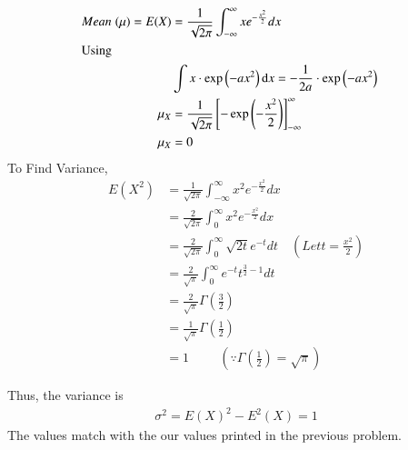 \documentclass[journal,10pt,twocolumn]{IEEEtran}
\newcounter{Chapcounter}
\numberwithin{equation}{subsection}
\numberwithin{figure}{subsection}
\renewcommand\thesection{\theChapcounter.\arabic{section}}
\providecommand{\brak}[1]{\ensuremath{\left(#1\right)}}
\renewcommand\thesection{\arabic{section}}
\renewcommand\thesubsection{\thesection.\arabic{subsection}}
\begin{document}
\begin{enumerate}[label=\thesubsection.\arabic*,ref=\thesubsection.\arabic{figure}]
\begin{align}
    Mean\hspace{0.1cm}(\mu) = E(X) &= \frac{1}{\sqrt{2\pi}} \int_{-\infty}^{\infty} x e^{-\frac{x^2}{2}}dx\\
    \intertext{Using}&
	\int x \cdot \exp \left( -a x^2 \right) \mathrm{d}x = -\frac{1}{2a} \cdot \exp \left( -a x^2 \right)&\\
	\mu_X &= \frac{1}{\sqrt{2\pi}}\left[-\exp\brak{-\frac{x^2}{2}}\right]_{-\infty}^{\infty}&\\  
	\mu_X &= 0
\end{align}
To Find Variance,
\begin{align}
    E\brak{X^2}&= \frac{1}{\sqrt{2\pi}}\int_{-\infty}^{\infty} x^2
e^ {-\frac{x^2}{2}} dx \\
    &= \frac{2}{\sqrt{2\pi}} \int_{0}^{\infty} x^2 e^{-\frac{x^2}{2}} dx\\
    &= \frac{2}{\sqrt{2\pi}}\int_{0}^{\infty}\sqrt{2t}e^{-t} dt \quad\brak{Let t = \frac{x^2}{2}}\\
    &= \frac{2}{\sqrt{\pi}} \int_{0}^{\infty} e^{-t} t^{\frac{3}{2}-1} dt\\
    &= \frac{2}{\sqrt{\pi}} \Gamma\brak{{\frac{3}{2}}}\\
    &= \frac{1}{\sqrt{\pi}}\Gamma\brak{\frac{1}{2}}  \\
    &= 1  \hspace{1cm} \brak{\because\Gamma\brak{\frac{1}{2}}=\sqrt{\pi}}
\end{align}

%
Thus, the  variance is
\begin{align}
    \sigma^2 =  E\brak X^2 - E^2\brak X = 1
\end{align}
The values match with the our values printed in the previous problem.
\end{enumerate}
\end{document}
